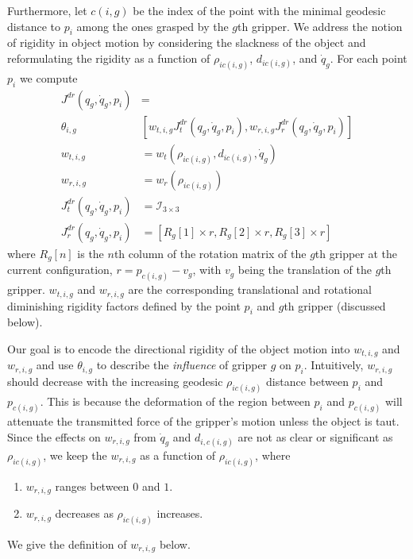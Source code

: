 Furthermore, let $c(i,g)$ be the index of the point with the minimal geodesic distance to $p_i$ among the ones grasped by the $g$th gripper. 
We address the notion of rigidity in object motion by considering the slackness of the object and reformulating the rigidity as a function of $\rho_{ic(i,g)}$, $d_{ic(i,g)}$, 
and $\dot{q}_g$. For each point $p_i$ we compute
\begin{equation}
\begin{split}
J^{dr}(q_g, \dot{q}_g, p_i)     &=\\
                   \theta_{i,g} &[w_{t,i,g} J^{dr}_{t}(q_g, \dot{q}_g, p_i), w_{r,i,g} J^{dr}_{r}(q_g, \dot{q}_g, p_i)] \\
w_{t,i,g}                       &= w_{t}(\rho_{ic(i,g)}, d_{ic(i,g)}, \dot{q}_g) \\    
w_{r,i,g}                       &= w_{r}(\rho_{ic(i,g)}) \\
J^{dr}_{t}(q_g, \dot{q}_g, p_i) &= \mathcal{I}_{3\times 3} \\
J^{dr}_{r}(q_g, \dot{q}_g, p_i) &= [R_g[1] \times r, R_g[2] \times r, R_g[3] \times r]
\end{split}
\label{Eq: trans_rot_rigidity_diminishing_jacobian}
\end{equation}
where $R_g[n]$ is the $n$th column of the rotation matrix of the $g$th gripper at the current configuration, $r = p_{c(i,g)} - v_g$, with $v_g$ being the translation of the $g$th gripper.
$w_{t,i,g}$ and $w_{r,i,g}$ are the corresponding translational and rotational diminishing rigidity factors defined by the point $p_i$ and $g$th gripper (discussed below). 

Our goal is to encode the directional rigidity of the object motion into $w_{t,i,g}$ and $w_{r,i,g}$ and use $\theta_{i,g}$ to describe the \textit{influence} of gripper $g$ on $p_i$. Intuitively, $w_{r,i,g}$ should decrease with the increasing geodesic $\rho_{ic(i,g)}$ distance between $p_i$ and $p_{c(i,g)}$. This is because the deformation of the region between $p_i$ and $p_{c(i,g)}$ will attenuate the transmitted force of the gripper's motion unless the object is taut. %
Since the effects on $w_{r,i,g}$ from $\dot{q}_g$ and $d_{i,c(i,g)}$ are not as clear or significant as $\rho_{ic(i,g)}$, we keep the $w_{r,i,g}$ as a function of $\rho_{ic(i,g)}$, where 

\begin{enumerate}
    \item $w_{r,i,g}$ ranges between $0$ and $1$.
    \item $w_{r,i,g}$ decreases as $\rho_{ic(i,g)}$ increases.
\end{enumerate}
\noindent We give the definition of $w_{r,i,g}$ below.

